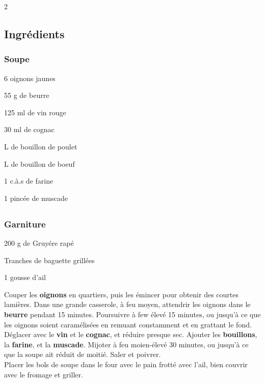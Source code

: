 \newpage
{}

\begin{multicols}{2}
	\subsection*{Ingrédients}
	\subsubsection*{Soupe}
	\begin{ingredients}
		\item 6 oignons jaunes
		\item 55 g de beurre
		\item 125 ml de vin rouge
		\item 30 ml de cognac
		\item {} L de bouillon de poulet
		\item {} L de bouillon de boeuf
		\item 1 c.à.s de farine
		\item 1 pincée de muscade
	\end{ingredients}
	
	\columnbreak
	
	\subsection*{}
	\subsubsection*{Garniture}
	\begin{ingredients}
		\item 200 g de Gruyére rapé
		\item Tranches de baguette grillées
		\item 1 gousse d'ail
	\end{ingredients}
	\vfill
\end{multicols}

\medskip

Couper les \textbf{oignons} en quartiers, puis les émincer pour obtenir des courtes lamières. 
Dans une grande casserole, à feu moyen, attendrir les oignons dans le \textbf{beurre} pendant 15 minutes. 
Poursuivre à few élevé 15 minutes, ou jusqu'à ce que les oignons soient caramélisées en remuant constamment et en grattant le fond. 
Déglacer avec le \textbf{vin} et le \textbf{cognac}, et réduire presque sec. 
Ajouter les \textbf{bouillons}, la \textbf{farine}, et la \textbf{muscade}.
Mijoter à feu moien-élevé 30 minutes, ou jusqu'à ce que la soupe ait réduit de moitié.
Saler et poivrer. \\

Placer les bols de soupe dans le four avec le pain frotté avec l'ail, bien couvrir avec le fromage et griller. 


\vspace*{0.75 cm}

\begin{recipeblock}
	
\end{recipeblock}